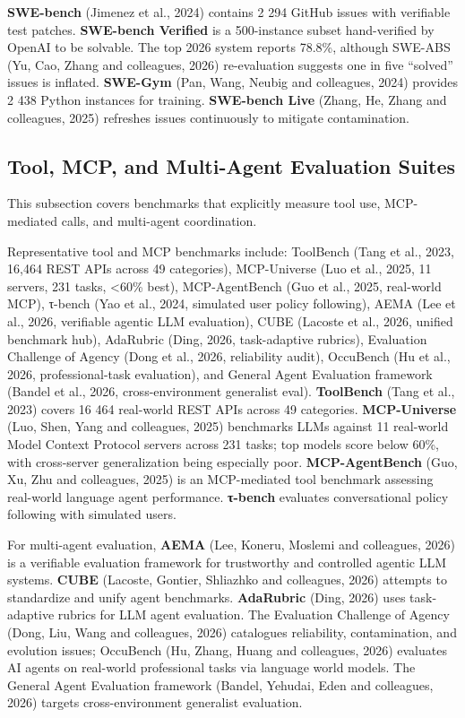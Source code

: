 \textbf{SWE-bench} (Jimenez et al., 2024) contains 2 294 GitHub issues with verifiable test patches. \textbf{SWE-bench Verified} is a 500-instance subset hand-verified by OpenAI to be solvable. The top 2026 system reports 78.8\%, although SWE-ABS (Yu, Cao, Zhang and colleagues, 2026) re-evaluation suggests one in five ``solved'' issues is inflated. \textbf{SWE-Gym} (Pan, Wang, Neubig and colleagues, 2024) provides 2 438 Python instances for training. \textbf{SWE-bench Live} (Zhang, He, Zhang and colleagues, 2025) refreshes issues continuously to mitigate contamination.

\subsection{Tool, MCP, and Multi-Agent Evaluation Suites}\label{tool-mcp-and-multi-agent-evaluation-suites}

This subsection covers benchmarks that explicitly measure tool use, MCP-mediated calls, and multi-agent coordination.

Representative tool and MCP benchmarks include: ToolBench (Tang et al., 2023, 16,464 REST APIs across 49 categories), MCP-Universe (Luo et al., 2025, 11 servers, 231 tasks, \textless60\% best), MCP-AgentBench (Guo et al., 2025, real-world MCP), τ-bench (Yao et al., 2024, simulated user policy following), AEMA (Lee et al., 2026, verifiable agentic LLM evaluation), CUBE (Lacoste et al., 2026, unified benchmark hub), AdaRubric (Ding, 2026, task-adaptive rubrics), Evaluation Challenge of Agency (Dong et al., 2026, reliability audit), OccuBench (Hu et al., 2026, professional-task evaluation), and General Agent Evaluation framework (Bandel et al., 2026, cross-environment generalist eval). \textbf{ToolBench} (Tang et al., 2023) covers 16 464 real-world REST APIs across 49 categories. \textbf{MCP-Universe} (Luo, Shen, Yang and colleagues, 2025) benchmarks LLMs against 11 real-world Model Context Protocol servers across 231 tasks; top models score below 60\%, with cross-server generalization being especially poor. \textbf{MCP-AgentBench} (Guo, Xu, Zhu and colleagues, 2025) is an MCP-mediated tool benchmark assessing real-world language agent performance. \textbf{τ-bench} evaluates conversational policy following with simulated users.

For multi-agent evaluation, \textbf{AEMA} (Lee, Koneru, Moslemi and colleagues, 2026) is a verifiable evaluation framework for trustworthy and controlled agentic LLM systems. \textbf{CUBE} (Lacoste, Gontier, Shliazhko and colleagues, 2026) attempts to standardize and unify agent benchmarks. \textbf{AdaRubric} (Ding, 2026) uses task-adaptive rubrics for LLM agent evaluation. The Evaluation Challenge of Agency (Dong, Liu, Wang and colleagues, 2026) catalogues reliability, contamination, and evolution issues; OccuBench (Hu, Zhang, Huang and colleagues, 2026) evaluates AI agents on real-world professional tasks via language world models. The General Agent Evaluation framework (Bandel, Yehudai, Eden and colleagues, 2026) targets cross-environment generalist evaluation.

